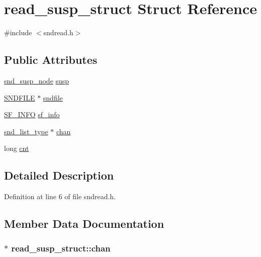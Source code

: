\hypertarget{structread__susp__struct}{}\section{read\+\_\+susp\+\_\+struct Struct Reference}
\label{structread__susp__struct}


{\ttfamily \#include $<$sndread.\+h$>$}

\subsection*{Public Attributes}
\begin{DoxyCompactItemize}
\item 
\hyperlink{sound_8h_a6b268203688a934bd798ceb55f85d4c0}{snd\+\_\+susp\+\_\+node} \hyperlink{structread__susp__struct_aa93f8c26d4f72c3b69fc682e65948b55}{susp}
\item 
\hyperlink{mac_2config_2i386_2lib-src_2libsndfile_2src_2sndfile_8h_ac14209bc83d532b06a8cdf9ade6d544a}{S\+N\+D\+F\+I\+LE} $\ast$ \hyperlink{structread__susp__struct_a5462b07a95b5b8ba5a8cc23d017daf48}{sndfile}
\item 
\hyperlink{struct_s_f___i_n_f_o}{S\+F\+\_\+\+I\+N\+FO} \hyperlink{structread__susp__struct_a4b43e49319e316b165cc2d1badfbc367}{sf\+\_\+info}
\item 
\hyperlink{sound_8h_ab05388854adb60c2855a70276d2ceb65}{snd\+\_\+list\+\_\+type} $\ast$ \hyperlink{structread__susp__struct_ab9f474a086054c5202af805c2bb92a67}{chan}
\item 
long \hyperlink{structread__susp__struct_ad2d502eafdfec2f25b8bda4e3cd383c9}{cnt}
\end{DoxyCompactItemize}


\subsection{Detailed Description}


Definition at line 6 of file sndread.\+h.



\subsection{Member Data Documentation}
\subsubsection[{\texorpdfstring{chan}{chan}}]{$\ast$ read\+\_\+susp\+\_\+struct\+::chan}\hypertarget{structread__susp__struct_ab9f474a086054c5202af805c2bb92a67}{}\label{structread__susp__struct_ab9f474a086054c5202af805c2bb92a67}


